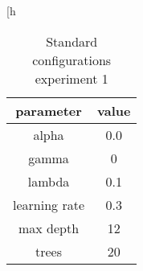 \begin{table}[h
\centering
\begin{tabular}{| c|c|}
\hline
parameter & value\\
\hline
alpha & 0.0\\\hline
gamma & 0\\\hline
lambda & 0.1\\\hline
learning rate & 0.3\\\hline
max depth & 12\\\hline
trees & 20\\\hline

\end{tabular}\caption{Standard configurations experiment 1} 
\label{tab:./Table/config experiment 2 targetandshadow}
\end{table}

